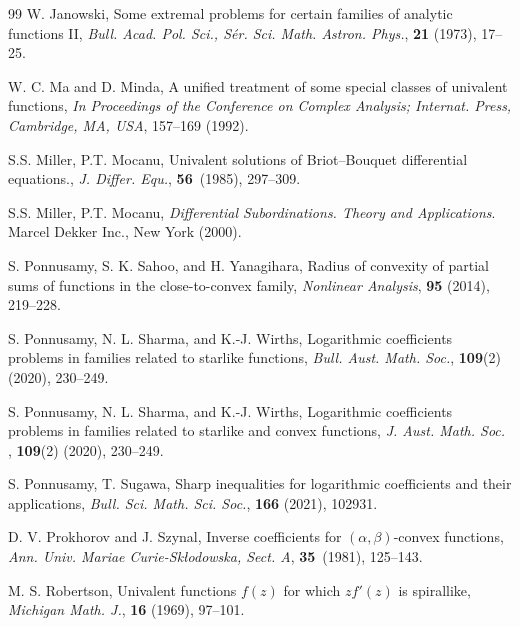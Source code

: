 \documentclass[a4paper,12pt]{amsart}
\theoremstyle{definition}
\begin{document}
\begin{thebibliography}{99}
{\sc W. Janowski},
Some extremal problems for certain families of analytic functions II, {\it Bull. Acad. Pol. Sci., S{\'e}r. Sci. Math. Astron. Phys.}, \textbf{21} (1973), 17--25.


 {\sc W. C. Ma and D. Minda}, A unified treatment of some special classes of univalent functions, {\it In Proceedings of the Conference on Complex Analysis; Internat. Press, Cambridge, MA, USA}, 157--169 (1992).



 {\sc S.S. Miller, P.T. Mocanu}, Univalent solutions of Briot–Bouquet differential equations., {\it J. Differ. Equ.},
 {\bf 56}~(1985), 297–309.



  {\sc  S.S. Miller, P.T. Mocanu},  \textit{Differential Subordinations. Theory and Applications}. 
Marcel Dekker Inc., New York (2000).

{\sc S. Ponnusamy, S. K. Sahoo, and H. Yanagihara}, 
Radius of convexity of partial sums of functions in the close-to-convex family, 
{\it Nonlinear Analysis}, \textbf{95} (2014), 219--228.



{\sc S. Ponnusamy, N. L. Sharma, and K.-J. Wirths}, 
Logarithmic coefficients problems in families related to starlike functions, 
{\it Bull. Aust. Math. Soc.}, \textbf{109}(2) (2020), 230--249.



  {\sc S. Ponnusamy, N. L. Sharma, and K.-J. Wirths}, Logarithmic coefficients problems in families
 related to starlike and convex functions,  {\it J. Aust. Math. Soc. }, {\bf 109}(2) (2020), 230–249.

{\sc  S. Ponnusamy,  T. Sugawa}, Sharp inequalities for logarithmic coefficients and their applications, {\it Bull. Sci. Math. Sci. Soc.}, \textbf{166} (2021), 102931.
 
{\sc D. V. Prokhorov and J. Szynal}, Inverse coefficients for $(\alpha, \beta)$-convex functions, \textit{Ann. Univ. Mariae Curie-Sk\l odowska, Sect. A}, \textbf{35}~(1981), 125--143.


{\sc M. S. Robertson}, 
Univalent functions \(f(z)\) for which \(zf'(z)\) is spirallike, 
{\it Michigan Math. J.}, \textbf{16} (1969), 97--101.




\end{thebibliography}
\end{document}
